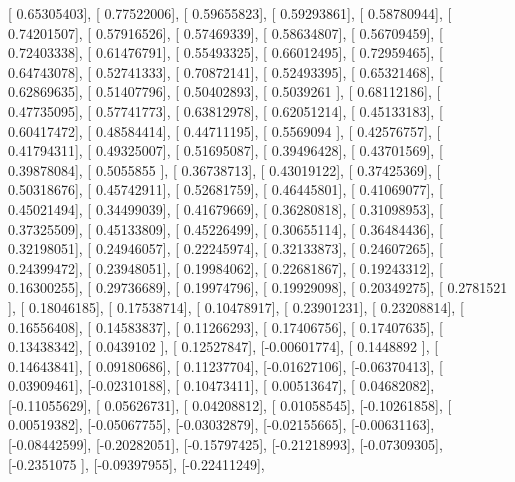 \documentclass{article}
\begin{document}
       [ 0.65305403],
       [ 0.77522006],
       [ 0.59655823],
       [ 0.59293861],
       [ 0.58780944],
       [ 0.74201507],
       [ 0.57916526],
       [ 0.57469339],
       [ 0.58634807],
       [ 0.56709459],
       [ 0.72403338],
       [ 0.61476791],
       [ 0.55493325],
       [ 0.66012495],
       [ 0.72959465],
       [ 0.64743078],
       [ 0.52741333],
       [ 0.70872141],
       [ 0.52493395],
       [ 0.65321468],
       [ 0.62869635],
       [ 0.51407796],
       [ 0.50402893],
       [ 0.5039261 ],
       [ 0.68112186],
       [ 0.47735095],
       [ 0.57741773],
       [ 0.63812978],
       [ 0.62051214],
       [ 0.45133183],
       [ 0.60417472],
       [ 0.48584414],
       [ 0.44711195],
       [ 0.5569094 ],
       [ 0.42576757],
       [ 0.41794311],
       [ 0.49325007],
       [ 0.51695087],
       [ 0.39496428],
       [ 0.43701569],
       [ 0.39878084],
       [ 0.5055855 ],
       [ 0.36738713],
       [ 0.43019122],
       [ 0.37425369],
       [ 0.50318676],
       [ 0.45742911],
       [ 0.52681759],
       [ 0.46445801],
       [ 0.41069077],
       [ 0.45021494],
       [ 0.34499039],
       [ 0.41679669],
       [ 0.36280818],
       [ 0.31098953],
       [ 0.37325509],
       [ 0.45133809],
       [ 0.45226499],
       [ 0.30655114],
       [ 0.36484436],
       [ 0.32198051],
       [ 0.24946057],
       [ 0.22245974],
       [ 0.32133873],
       [ 0.24607265],
       [ 0.24399472],
       [ 0.23948051],
       [ 0.19984062],
       [ 0.22681867],
       [ 0.19243312],
       [ 0.16300255],
       [ 0.29736689],
       [ 0.19974796],
       [ 0.19929098],
       [ 0.20349275],
       [ 0.2781521 ],
       [ 0.18046185],
       [ 0.17538714],
       [ 0.10478917],
       [ 0.23901231],
       [ 0.23208814],
       [ 0.16556408],
       [ 0.14583837],
       [ 0.11266293],
       [ 0.17406756],
       [ 0.17407635],
       [ 0.13438342],
       [ 0.0439102 ],
       [ 0.12527847],
       [-0.00601774],
       [ 0.1448892 ],
       [ 0.14643841],
       [ 0.09180686],
       [ 0.11237704],
       [-0.01627106],
       [-0.06370413],
       [ 0.03909461],
       [-0.02310188],
       [ 0.10473411],
       [ 0.00513647],
       [ 0.04682082],
       [-0.11055629],
       [ 0.05626731],
       [ 0.04208812],
       [ 0.01058545],
       [-0.10261858],
       [ 0.00519382],
       [-0.05067755],
       [-0.03032879],
       [-0.02155665],
       [-0.00631163],
       [-0.08442599],
       [-0.20282051],
       [-0.15797425],
       [-0.21218993],
       [-0.07309305],
       [-0.2351075 ],
       [-0.09397955],
       [-0.22411249],
\end{document}

